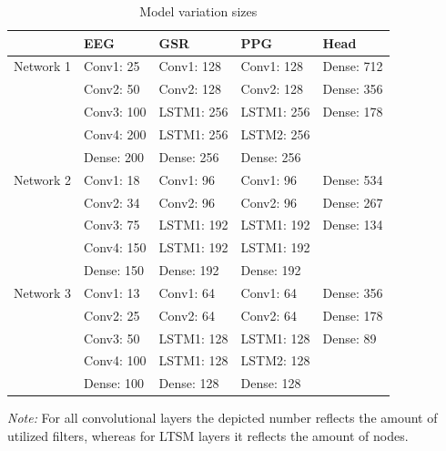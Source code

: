 \documentclass[12pt]{article}
\begin{document}
\bgroup
\def\arraystretch{1.6}%
\begin{table}[h]
\centering
\caption{Model variation sizes}
\label{table:modelvariations}
\begin{tabular}{lllll}
\hline
        & EEG        & GSR        & PPG        & Head       \\ \hline
Network 1 & Conv1: 25  & Conv1: 128 & Conv1: 128 & Dense: 712 \\
        & Conv2: 50  & Conv2: 128 & Conv2: 128 & Dense: 356 \\
        & Conv3: 100 & LSTM1: 256 & LSTM1: 256 & Dense: 178 \\
        & Conv4: 200 & LSTM1: 256 & LSTM2: 256 &            \\ 
        \vspace{3ex}
        & Dense: 200 & Dense: 256 & Dense: 256 &            \\ \hline
Network 2 & Conv1: 18  & Conv1: 96  & Conv1: 96  & Dense: 534 \\
        & Conv2: 34  & Conv2: 96  & Conv2: 96  & Dense: 267 \\
        & Conv3: 75  & LSTM1: 192 & LSTM1: 192 & Dense: 134 \\
        & Conv4: 150 & LSTM1: 192 & LSTM1: 192 &            \\
        \vspace{3ex}
        & Dense: 150 & Dense: 192 & Dense: 192 &            \\ \hline
Network 3 & Conv1: 13  & Conv1: 64  & Conv1: 64  & Dense: 356 \\
        & Conv2: 25  & Conv2: 64  & Conv2: 64  & Dense: 178 \\
        & Conv3: 50  & LSTM1: 128 & LSTM1: 128 & Dense: 89  \\
        & Conv4: 100 & LSTM1: 128 & LSTM2: 128 &            \\
        & Dense: 100 & Dense: 128 & Dense: 128 &            \\ \hline
\end{tabular}
\vspace{2ex}

\begin{doublespacing}
{\raggedright \textit{Note:} For all convolutional layers the depicted number reflects the amount of utilized filters, whereas for LTSM layers it reflects the amount  of nodes. \par}
\end{doublespacing}
\end{table}
\egroup
\end{document}
